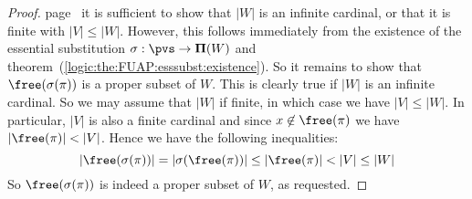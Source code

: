 \begin{proof}
page~\pageref{logic:the:FUAP:esssubst:existence} it is sufficient to
show that $|W|$ is an infinite cardinal, or that it is finite with
$|V|\leq|W|$. However, this follows immediately from the existence
of the essential substitution $\sigma:\pvs\to{\bf\Pi}(W)$ and
theorem~(\ref{logic:the:FUAP:esssubst:existence}). So it remains to
show that $\free(\sigma(\pi))$ is a proper subset of $W$. This is
clearly true if $|W|$ is an infinite cardinal. So we may assume that
$|W|$ if finite, in which case we have $|V|\leq |W|$. In particular,
$|V|$ is also a finite cardinal and since $x\not\in\free(\pi)$ we
have $|\free(\pi)|<|V|$. Hence we have the following inequalities:
    \[
    |\free(\sigma(\pi))|=|\sigma(\free(\pi))|\leq|\free(\pi)|<|V|\leq|W|
    \]
So $\free(\sigma(\pi))$ is indeed a proper subset of $W$, as
requested.
\end{proof}
